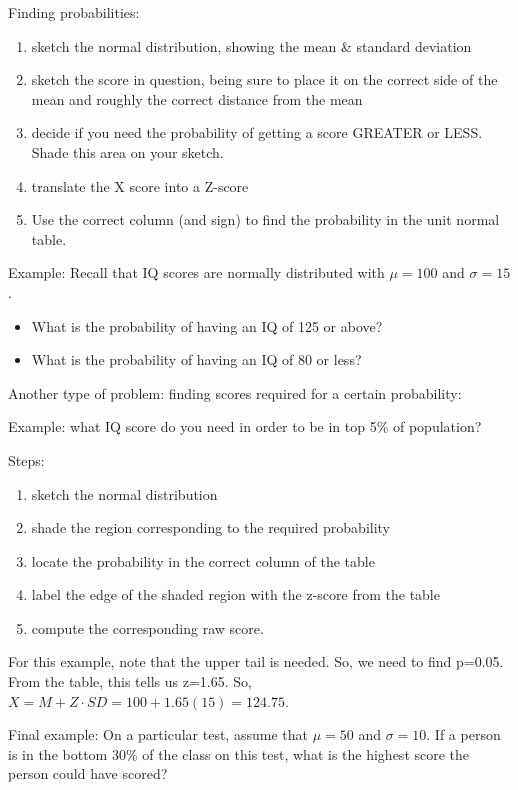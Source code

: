 \documentclass[11pt]{article}
\begin{document}
Finding probabilities:

\begin{enumerate}
\item sketch the normal distribution, showing the mean \& standard deviation
\item sketch the score in question, being sure to place it on the correct side of the mean and roughly the correct distance from the mean
\item decide if you need the probability of getting a score GREATER or LESS. Shade this area on your sketch.
\item translate the X score into a Z-score
\item Use the correct column (and sign) to find the probability in the unit normal table.
\end{enumerate}

Example:  Recall that IQ scores are normally distributed with $\mu=100$ and $\sigma = 15$. 
\begin{itemize}
\item What is the probability of having an IQ of 125 or above?
\item What is the probability of having an IQ of 80 or less?
\end{itemize}


Another type of problem: finding scores required for a certain probability:

Example: what IQ score do you need in order to be in top 5\% of population?

Steps:
\begin{enumerate}
\item sketch the normal distribution
\item shade the region corresponding to the required probability
\item locate the probability in the correct column of the table
\item label the edge of the shaded region with the z-score from the table
\item compute the corresponding raw score.
\end{enumerate}

For this example, note that the upper tail is needed.  So, we need to find p=0.05.  From the table, this tells us z=1.65.  So, $X=M+Z\cdot SD = 100 + 1.65(15)=124.75$.

Final example: On a particular test, assume that $\mu=50$ and $\sigma=10$.  If a person is in the bottom 30\% of the class on this test, what is the highest score the person could have scored?
\end{document}
